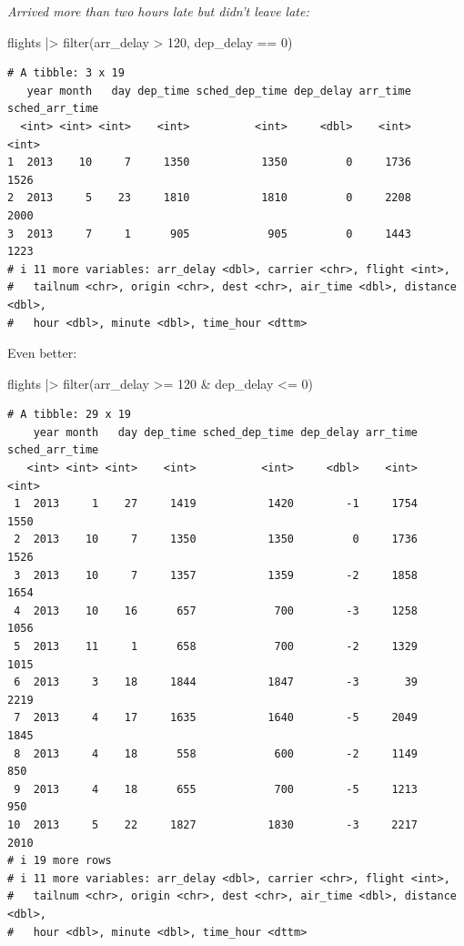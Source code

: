\documentclass[
  letterpaper,
  DIV=11,
  numbers=noendperiod]{scrreprt}
\newenvironment{Shaded}{\begin{snugshade}}{\end{snugshade}}
\newcommand{\DecValTok}[1]{\textcolor[rgb]{0.68,0.00,0.00}{#1}}
\newcommand{\FunctionTok}[1]{\textcolor[rgb]{0.28,0.35,0.67}{#1}}
\newcommand{\NormalTok}[1]{\textcolor[rgb]{0.00,0.23,0.31}{#1}}
\newcommand{\SpecialCharTok}[1]{\textcolor[rgb]{0.37,0.37,0.37}{#1}}
\begin{document}
\emph{Arrived more than two hours late but didn't leave late:}

\begin{Shaded}
\begin{Highlighting}[]
\NormalTok{flights }\SpecialCharTok{|\textgreater{}}
  \FunctionTok{filter}\NormalTok{(arr\_delay }\SpecialCharTok{\textgreater{}} \DecValTok{120}\NormalTok{, dep\_delay }\SpecialCharTok{==} \DecValTok{0}\NormalTok{)}
\end{Highlighting}
\end{Shaded}

\begin{verbatim}
# A tibble: 3 x 19
   year month   day dep_time sched_dep_time dep_delay arr_time sched_arr_time
  <int> <int> <int>    <int>          <int>     <dbl>    <int>          <int>
1  2013    10     7     1350           1350         0     1736           1526
2  2013     5    23     1810           1810         0     2208           2000
3  2013     7     1      905            905         0     1443           1223
# i 11 more variables: arr_delay <dbl>, carrier <chr>, flight <int>,
#   tailnum <chr>, origin <chr>, dest <chr>, air_time <dbl>, distance <dbl>,
#   hour <dbl>, minute <dbl>, time_hour <dttm>
\end{verbatim}

Even better:

\begin{Shaded}
\begin{Highlighting}[]
\NormalTok{flights }\SpecialCharTok{|\textgreater{}}
  \FunctionTok{filter}\NormalTok{(arr\_delay }\SpecialCharTok{\textgreater{}=} \DecValTok{120} \SpecialCharTok{\&}\NormalTok{ dep\_delay }\SpecialCharTok{\textless{}=} \DecValTok{0}\NormalTok{)}
\end{Highlighting}
\end{Shaded}

\begin{verbatim}
# A tibble: 29 x 19
    year month   day dep_time sched_dep_time dep_delay arr_time sched_arr_time
   <int> <int> <int>    <int>          <int>     <dbl>    <int>          <int>
 1  2013     1    27     1419           1420        -1     1754           1550
 2  2013    10     7     1350           1350         0     1736           1526
 3  2013    10     7     1357           1359        -2     1858           1654
 4  2013    10    16      657            700        -3     1258           1056
 5  2013    11     1      658            700        -2     1329           1015
 6  2013     3    18     1844           1847        -3       39           2219
 7  2013     4    17     1635           1640        -5     2049           1845
 8  2013     4    18      558            600        -2     1149            850
 9  2013     4    18      655            700        -5     1213            950
10  2013     5    22     1827           1830        -3     2217           2010
# i 19 more rows
# i 11 more variables: arr_delay <dbl>, carrier <chr>, flight <int>,
#   tailnum <chr>, origin <chr>, dest <chr>, air_time <dbl>, distance <dbl>,
#   hour <dbl>, minute <dbl>, time_hour <dttm>
\end{verbatim}
\end{document}
